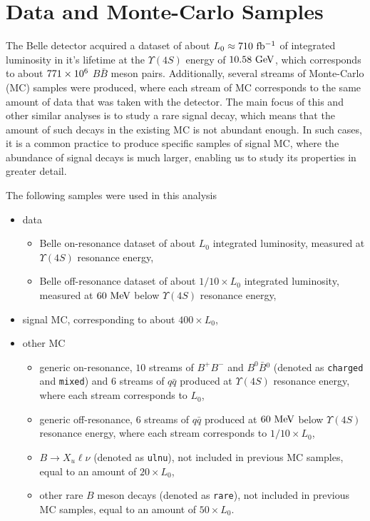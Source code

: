 \chapter{Data and Monte-Carlo Samples}\label{sec:data-and-monte-carlo-samples}

The Belle detector acquired a dataset of about $L_0 \approx 710\mathrm{~fb^{-1}}$ of integrated luminosity in it's lifetime at the $\Upsilon(4S)$ energy of $10.58\mathrm{~GeV}$, which corresponds to about $771\times 10^{6}$ $B \bar B$ meson pairs. Additionally, several streams of Monte-Carlo (MC) samples were produced, where each stream of MC corresponds to the same amount of data that was taken with the detector. The main focus of this and other similar analyses is to study a rare signal decay, which means that the amount of such decays in the existing MC is not abundant enough. In such cases, it is a common practice to produce specific samples of signal MC, where the abundance of signal decays is much larger, enabling us to study its properties in greater detail.

The following samples were used in this analysis
\begin{itemize}
	\item data
	\begin{itemize}
		\item Belle on-resonance dataset of about $L_0$ integrated luminosity, measured at $\Upsilon(4S)$ resonance energy,
		\item Belle off-resonance dataset of about $1/10 \times L_0$ integrated luminosity, measured at $60\mathrm{~MeV}$ below $\Upsilon(4S)$ resonance energy,
	\end{itemize}
	\item signal MC, corresponding to about $400 \times L_0$,
	\item other MC
	\begin{itemize}
		\item generic on-resonance, $10$ streams of $B^+B^-$ and $B^0\bar B{}^0$ (denoted as \texttt{charged} and \texttt{mixed}) and $6$ streams of $q\bar q$ produced at $\Upsilon(4S)$ resonance energy, where each stream corresponds to $L_0$,
		\item generic off-resonance, $6$ streams of $q\bar q$ produced at $60\mathrm{~MeV}$ below $\Upsilon(4S)$ resonance energy, where each stream corresponds to $1/10 \times L_0$,
		\item $B\to X_u \ell \nu$ (denoted as \texttt{ulnu}), not included in previous MC samples, equal to an amount of $20 \times L_0$, 
		\item other rare $B$ meson decays (denoted as \texttt{rare}), not included in previous MC samples, equal to an amount of $50 \times L_0$.
	\end{itemize}
\end{itemize}

